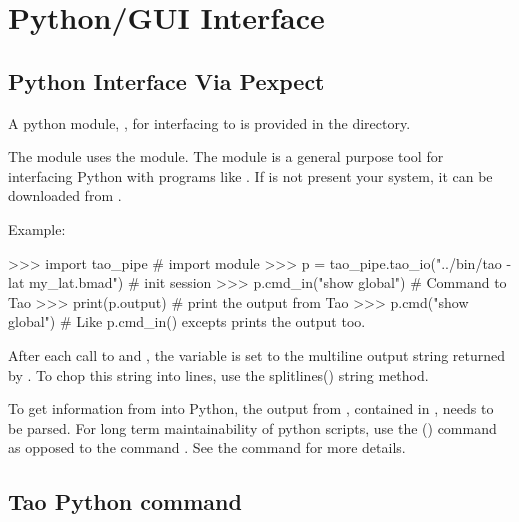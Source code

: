 \chapter{Python/GUI Interface}
\label{c:python}

\section{Python Interface Via Pexpect}

A python module, , for interfacing \tao to 
is provided in the  directory. 

The  module uses the  module. The
 module is a general purpose tool for interfacing
Python with programs like \tao. If  is not present
your system, it can be downloaded from
. 

Example:
\begin{example}
  >>> import tao_pipe                                       # import module
  >>> p = tao_pipe.tao_io("../bin/tao -lat my_lat.bmad")    # init session
  >>> p.cmd_in("show global")               # Command to Tao
  >>> print(p.output)                       # print the output from Tao
  >>> p.cmd("show global")                  # Like p.cmd_in() excepts prints the output too.
\end{example}

After each call to  and , the
 variable is set to the multiline output string
returned by \tao. To chop this string into lines, use the splitlines()
string method.

To get information from \tao into Python, the output from \tao,
contained in , needs to be parsed. For long term
maintainability of python scripts, use the  () command 
as opposed to the  command . See the  command for more details.

\section{Tao Python command}




